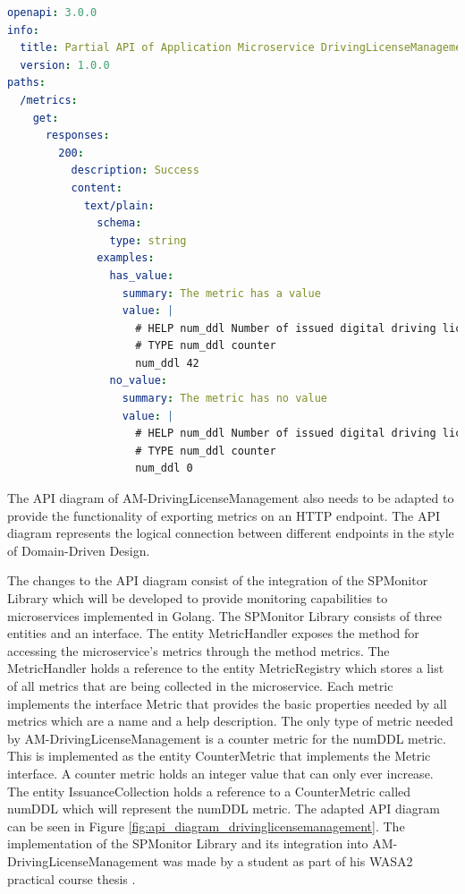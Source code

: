 \begin{lstlisting}[caption = {Partial API Specification of Application Microservice DrivingLicenseManagement}, label = {lis:api_spec_drivinglicensemanagement}, style = kit-cm, language=yaml]
openapi: 3.0.0
info:
  title: Partial API of Application Microservice DrivingLicenseManagement
  version: 1.0.0
paths:
  /metrics:
    get:
      responses:
        200:
          description: Success
          content:
            text/plain:
              schema:
                type: string
              examples:
                has_value: 
                  summary: The metric has a value
                  value: |
                    # HELP num_ddl Number of issued digital driving licenses
                    # TYPE num_ddl counter
                    num_ddl 42
                no_value: 
                  summary: The metric has no value
                  value: |
                    # HELP num_ddl Number of issued digital driving licenses
                    # TYPE num_ddl counter
                    num_ddl 0
\end{lstlisting}

The API diagram of AM-DrivingLicenseManagement also
needs to be adapted to provide the functionality of exporting metrics on an
HTTP endpoint. The API diagram represents the logical connection between
different endpoints in the style of Domain-Driven Design.

The changes to the API diagram consist of the integration of the SPMonitor
Library which will be developed to provide monitoring capabilities to
microservices implemented in Golang. The SPMonitor Library consists of three
entities and an interface. The entity MetricHandler exposes the method for
accessing the microservice's metrics through the method metrics. The
MetricHandler holds a reference to the entity MetricRegistry which stores a
list of all metrics that are being collected in the microservice. Each metric
implements the interface Metric that provides the basic properties needed by
all metrics which are a name and a help description. The only type of metric
needed by AM-DrivingLicenseManagement is a counter metric for the numDDL metric.
This is implemented as the entity CounterMetric that implements the Metric
interface. A counter metric holds an integer value that can only ever increase.
The entity IssuanceCollection holds a reference to a CounterMetric called
numDDL which will represent the numDDL metric. The adapted API diagram can be
seen in Figure \ref{fig:api_diagram_drivinglicensemanagement}. The
implementation of the SPMonitor Library and its integration into
AM-DrivingLicenseManagement was made by a student as part of his WASA2 practical
course thesis \cite{Am23}.

